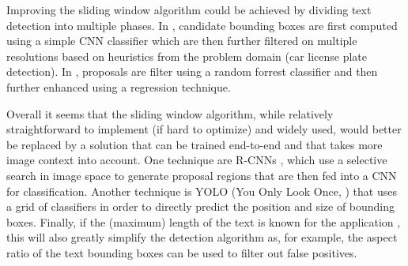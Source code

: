 \documentclass[12pt]{article}
\begin{document}
Improving the sliding window algorithm could be achieved by dividing text detection into
multiple phases. In \cite{Li2016}, candidate bounding boxes are first computed using a
simple CNN classifier which are then further filtered on multiple resolutions
based on heuristics from the problem domain (car license plate detection). In \cite{Jaderberg2016},
proposals are filter using a random forrest classifier and then further enhanced using a regression
technique.

Overall it seems that the sliding window algorithm, while relatively straightforward to implement
(if hard to optimize) and widely used, would better be replaced by a solution that can be trained
end-to-end and that takes more image context into account. One technique are R-CNNs \cite{Girshick2013,Jaderberg2016},
which use a selective search in image space to generate proposal regions that are then fed
into a CNN for classification. Another technique is YOLO (You Only Look Once, \cite{Redmon}) that
uses a grid of classifiers in order to directly predict the position and size of bounding boxes.
Finally, if the (maximum) length of the text is known for the application \cite{Goodfellow2013,Li2016}, this will also greatly simplify
the detection algorithm as, for example, the aspect ratio of the text bounding boxes can be used
to filter out false positives.

\newpage


\end{document}
